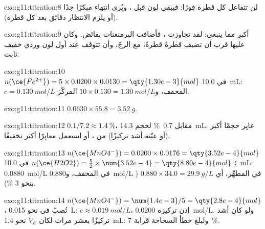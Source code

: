\begin{solution}{exo:g11:titration:8}
لن تتفاعل كل قطرة فورًا: فيبقى لون 
قبل ، ويُرى انتهاء  مبكرًا جدًا (أو يلزم
الانتظار دقائق بعد كل قطرة).
\end{solution}

\begin{solution}{exo:g11:titration:9}
أكبر مما ينبغي: لقد تجاوزت ، فأضافت البرمنغنات بفائض.
وكان عليها قرب  أن تضيف  قطرةً قطرةً،
مع الرجّ، وأن تتوقف عند أول لون وردي خفيف ثابت.
\end{solution}

\begin{solution}{exo:g11:titration:10}
$n(\ce{Fe^{2+}}) = 5 \times 0.0200 \times 0.0130 = \qty{1.30e-3}{mol}$ في
\qty{10.0}{mL}: $c = \qty{0.130}{mol/L}$  المخفف،
و$10 \times 0.130 = \qty{1.30}{mol/L}$  المركّز.
\end{solution}

\begin{solution}{exo:g11:titration:11}
$0.0630 \times 55.8 = \qty{3.52}{g}$.
\end{solution}

\begin{solution}{exo:g11:titration:12}
$0.1 / 7.2 \approx \qty{1.4}{\percent}$، مقابل
\qty{0.7}{\percent} لحجم \qty{14.3}{mL}. عايِر حجمًا أكبر (أو عيّنة
أشد تركيزًا) من ، أو استعمل  معايِرًا أكثر تخفيفًا.
\end{solution}

\begin{solution}{exo:g11:titration:13}
$n(\ce{MnO4^-}) = 0.0200 \times 0.0176 = \qty{3.52e-4}{mol}$؛
$n(\ce{H2O2}) = \frac{5}{2} \times \num{3.52e-4} = \qty{8.80e-4}{mol}$ في
\qty{10.0}{mL}: \qty{0.0880}{mol/L} في  المخفف،
و\qty{0.880}{mol/L} في المطهِّر، أي
$0.880 \times 34.0 = \qty{29.9}{g/L}$ ( بنحو 3 \%).
\end{solution}

\begin{solution}{exo:g11:titration:14}
$n(\ce{MnO4^-}) = \num{1.4e-3} / 5 = \qty{2.8e-4}{mol}$، تُصبّ
في نحو \qty{0.015}{L}: $c \approx \qty{0.019}{mol/L}$، إذن
 تركيزه \qty{0.0200}{mol/L}. ولو كان أشد تركيزًا بعشر مرات لكان $V_E$
نحو \qty{1.4}{mL}: ولبلغ خطأ السحاحة قرابة
\qty{7}{\percent}.
\end{solution}

